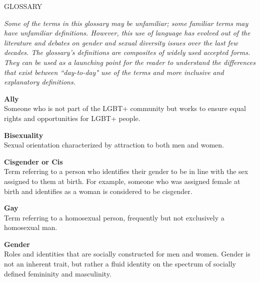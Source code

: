 %
\begin{titlepage}
\setcounter{page}{7}
\hfill\Large{GLOSSARY}
\label{glossary}		%
\normalsize			%
\vspace*{\baselineskip}

\emph{Some of the terms in this glossary may be unfamiliar; some familiar terms may have unfamiliar definitions. However, this use of language has evolved out of the literature and debates on gender and sexual diversity issues over the last few decades. The glossary's definitions are composites of widely used accepted forms. They can be used as a launching point for the reader to understand the differences that exist between ``day-to-day" use of the terms and more inclusive and explanatory definitions.}

\vspace*{\baselineskip}
\noindent\textbf{Ally}\\
Someone who is not part of the LGBT+ community but works to ensure equal rights and opportunities for LGBT+ people.\vspace*{\baselineskip}

\noindent\textbf{Bisexuality}\\
Sexual orientation characterized by attraction to both men and women.\vspace*{\baselineskip}

\noindent\textbf{Cisgender or Cis}\\
Term referring to a person who identifies their gender to be in line with the sex assigned to them at birth. For example, someone who was assigned female at birth and identifies as a woman is considered to be cisgender.\vspace*{\baselineskip}

\noindent\textbf{Gay}\\
Term referring to a homosexual person, frequently but not exclusively a homosexual man.\vspace*{\baselineskip}

\noindent\textbf{Gender}\\
Roles and identities that are socially constructed for men and women. Gender is not an inherent trait, but rather a fluid identity on the spectrum of socially defined femininity and masculinity.\vspace*{\baselineskip}


\end{titlepage}

